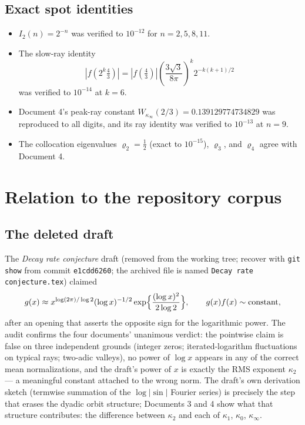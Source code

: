 \documentclass[11pt,oneside]{article}
\theoremstyle{definition}
\theoremstyle{remark}
\begin{document}
\subsection{Exact spot identities}

\begin{itemize}
\item $I_2(n)=2^{-n}$ was verified to $10^{-12}$ for $n=2,5,8,11$.
\item The slow-ray identity
\[
 |f(2^k\tfrac43)|
 =|f(\tfrac43)|\left(\frac{3\sqrt3}{8\pi}\right)^k2^{-k(k+1)/2}
\]
was verified to $10^{-14}$ at $k=6$.
\item Document 4's peak-ray constant
$W_{\kappa_\infty}(2/3)=0.139129774734829$ was reproduced to all digits,
and its ray identity was verified to $10^{-13}$ at $n=9$.
\item The collocation eigenvalues $\varrho_2=\tfrac12$ (exact to
$10^{-15}$), $\varrho_3$, and $\varrho_4$ agree with Document 4.
\end{itemize}

\section{Relation to the repository corpus}
\label{sec:corpus}

\subsection{The deleted draft}
\label{sec:draft}

The \emph{Decay rate conjecture} draft (removed from the working tree;
recover with \texttt{git show} from commit \texttt{e1cdd6260}; the archived
file is named \texttt{Decay rate conjecture.tex})
claimed
\[
 g(x)\approx x^{\log(2\pi)/\log2}(\log x)^{-1/2}
 \exp\Bigl\{\frac{(\log x)^2}{2\log2}\Bigr\},
 \qquad g(x)f(x)\sim\text{constant},
\]
after an opening that asserts the opposite sign for the logarithmic
power.  The audit confirms the four documents' unanimous verdict: the
pointwise claim is false on three independent grounds (integer zeros;
iterated-logarithm fluctuations on typical rays; two-adic valleys), no
power of $\log x$ appears in any of the correct mean normalizations, and
the draft's power of $x$ is exactly the RMS exponent $\kappa_2$ ---
a meaningful constant attached to the wrong norm.  The draft's own
derivation sketch (termwise summation of the $\log|{\sin}|$ Fourier
series) is precisely the step that erases the dyadic orbit structure;
Documents 3 and 4 show what that structure contributes: the difference
between $\kappa_2$ and each of $\kappa_1$, $\kappa_0$, $\kappa_\infty$.
\end{document}
